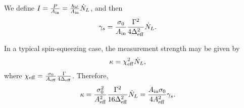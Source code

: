 We define $ I=\frac{P}{A_{\rm in}}= \frac{\hbar \omega }{A_{\rm in}} \dot{N}_L $, and then
\begin{align}
\gamma_s &= \frac{\sigma_0 }{A_{\rm in}} \frac{\Gamma^2}{4\Delta_{\rm eff}^2}\dot{N}_L.
\end{align}

In a typical spin-squeezing case, the measurement strength may be given by
\begin{align}
\kappa &= \chi_{\rm eff}^2 \dot{N}_L,
\end{align} 
where $ \chi_{\rm eff}= \frac{\sigma_0}{A_{\rm eff}} \frac{\Gamma}{4\Delta_{\rm eff}} $.
Therefore,
\begin{align}
\kappa &= \frac{\sigma_0^2}{A_{\rm eff}^2} \frac{\Gamma^2}{16 \Delta_{\rm eff}^2} \dot{N}_L 
= \frac{A_{\rm in}\sigma_0}{4 A_{\rm eff}^2}\gamma_s.
\end{align}


%


